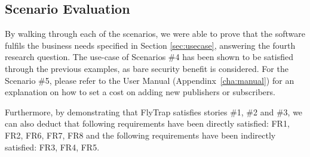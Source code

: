 \subsection{Scenario Evaluation}
By walking through each of the scenarios, we were able to prove that the software fulfils the business needs specified in Section \ref{sec:usecase}, answering the fourth research question. The use-case of Scenarios \#4 has been shown to be satisfied through the previous examples, as bare security benefit is considered. For the Scenario \#5, please refer to the User Manual (Appendinx~\ref{cha:manual}) for an explanation on how to set a cost on adding new publishers or subscribers.

Furthermore, by demonstrating that FlyTrap satisfies stories \#1, \#2 and \#3, we can also deduct that following requirements have been directly satisfied: FR1, FR2, FR6, FR7, FR8 and the following requirements have been indirectly satisfied: FR3, FR4, FR5. 
